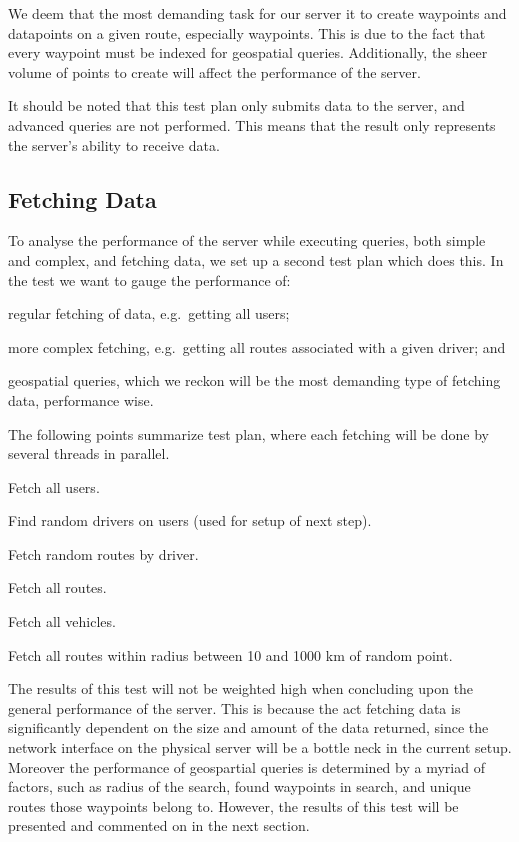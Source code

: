 We deem that the most demanding task for our server it to create waypoints and datapoints on a given route, especially waypoints.
This is due to the fact that every waypoint must be indexed for geospatial queries.
Additionally, the sheer volume of points to create will affect the performance of the server.

It should be noted that this test plan only submits data to the server, and advanced queries are not performed.
This means that the result only represents the server's ability to receive data.

\subsection{Fetching Data}
To analyse the performance of the server while executing queries, both simple and complex, and fetching data, we set up a second test plan which does this.
In the test we want to gauge the performance of:
\begin{enumberate*}
    \item regular fetching of data, e.g.~getting all users;
    \item more complex fetching, e.g.~getting all routes associated with a given driver; and
    \item geospatial queries, which we reckon will be the most demanding type of fetching data, performance wise.
\end{enumberate*}

The following points summarize test plan, where each fetching will be done by several threads in parallel.
\begin{enumberate}
    \item Fetch all users.
    \item Find random drivers on users (used for setup of next step).
    \item Fetch random routes by driver.
    \item Fetch all routes.
    \item Fetch all vehicles.
    \item Fetch all routes within radius between 10 and 1000 km of random point.
\end{enumberate}

The results of this test will not be weighted high when concluding upon the general performance of the server.
This is because the act fetching data is significantly dependent on the size and amount of the data returned, since the network interface on the physical server will be a bottle neck in the current setup.
Moreover the performance of geospartial queries is determined by a myriad of factors, such as radius of the search, found waypoints in search, and unique routes those waypoints belong to.
However, the results of this test will be presented and commented on in the next section.

